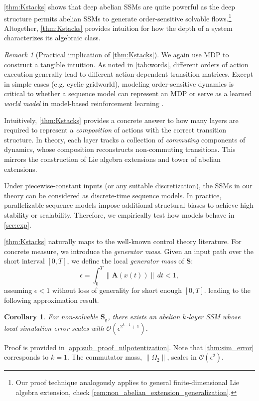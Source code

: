 \documentclass{article}
\theoremstyle{plain}
\newtheorem{corollary}[theorem]{Corollary}
\theoremstyle{definition}
\theoremstyle{remark}
\newtheorem{remark}[theorem]{Remark}
\newcommand{\fr}[1]{\mathfrak{#1}}
\newcommand{\mcal}[1]{\mathcal{#1}}
\newcommand{\mbf}[1]{\mathbf{#1}}
\begin{document}
\cref{thm:Kstacks} shows that deep abelian SSMs are quite powerful as the deep structure permits abelian SSMs to generate order-sensitive solvable flows.\footnote{
Our proof technique analogously applies to general finite-dimensional Lie algebra extension,
check \cref{rem:non_abelian_extension_generalization}.}
Altogether, \cref{thm:Kstacks} provides
intuition for how the depth of a system characterizes its algebraic class.
\begin{remark}[Practical implication of \cref{thm:Kstacks}]
We again use MDP to construct a tangible intuition. As noted in \cref{tab:words}, different orders of action execution generally lead to different action-dependent transition matrices.
    Except in simple cases (e.g. cyclic gridworld), modeling order-sensitive dynamics is critical to whether a sequence model can represent an MDP or serve as a learned \emph{world model} in model-based reinforcement learning \cite{chen2022transdreamer}.
    
    Intuitively, \cref{thm:Kstacks} provides a concrete answer to how many layers are required to represent a \emph{composition} of actions with the correct transition structure.
    In theory, each layer tracks a collection of \emph{commuting} components of dynamics, whose composition reconstructs non-commuting transitions.
    This mirrors the construction of Lie algebra extensions and tower of abelian extensions.
    
    Under piecewise-constant inputs (or any suitable discretization), the SSMs in our theory can be considered as discrete-time sequence models.
    In practice, parallelizable sequence models impose additional structural biases to achieve high stability or  scalability.
    Therefore, we empirically test how models behave in \cref{sec:exp}.
\end{remark}
\vspace{2mm}
\cref{thm:Kstacks} naturally maps to the well-known control theory literature.
For concrete measure, we introduce the \emph{generator mass}.
Given an input path over the short interval $[0,T]$,
we define the local \emph{generator mass} of $\mbf{S}$:
    \begin{equation*}
        \epsilon = \int_0^T \|\mbf{A}(x(t))\| \, dt < 1,
    \end{equation*}
assuming $\epsilon < 1$ without loss of generality for short enough $[0,T]$.
leading to the following approximation result.
\begin{corollary}
\label{col:nilpotentization}
    For non-solvable $\mbf{S}_\fr{g}$, there exists an abelian $k$-layer SSM whose
    local simulation error scales with $\mcal{O}(\epsilon^{2^{k-1}+1})$.
\end{corollary}
Proof is provided in \cref{app:sub_proof_nilpotentization}.
Note that \cref{thm:sim_error} corresponds to $k=1$. The commutator mass, $\|\Omega_2\|$, scales in $\mcal{O}(\epsilon^2)$.
\end{document}
